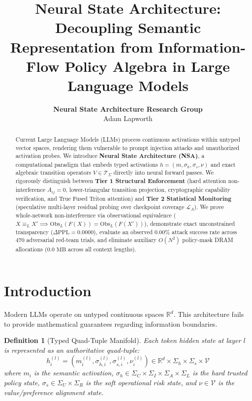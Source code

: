 \documentclass[10pt,twocolumn,letterpaper]{article}
\title{\textbf{Neural State Architecture: Decoupling Semantic Representation from Information-Flow Policy Algebra in Large Language Models}}
\author{
  \textbf{Neural State Architecture Research Group}\\
  Adam Lapworth
}
\newtheorem{definition}{Definition}
\begin{document}
\maketitle

\begin{abstract}
Current Large Language Models (LLMs) process continuous activations within untyped vector spaces, rendering them vulnerable to prompt injection attacks and unauthorized activation probes. We introduce \textbf{Neural State Architecture (NSA)}, a computational paradigm that embeds typed activations $h = (m, \sigma_h, \sigma_s, \nu)$ and exact algebraic transition operators $V \in \mathcal{T}_\Sigma$ directly into neural forward passes. We rigorously distinguish between \textbf{Tier 1 Structural Enforcement} (hard attention non-interference $A_{ij} = 0$, lower-triangular transition projection, cryptographic capability verification, and True Fused Triton attention) and \textbf{Tier 2 Statistical Monitoring} (speculative multi-layer residual probing over checkpoint coverage $\mathcal{L}_A$). We prove whole-network non-interference via observational equivalence ($X \equiv_L X' \implies \text{Obs}_L(F(X)) = \text{Obs}_L(F(X'))$), demonstrate exact unconstrained transparency ($\Delta \text{PPL} = 0.0000$), evaluate an observed 0.00\% attack success rate across 470 adversarial red-team trials, and eliminate auxiliary $O(N^2)$ policy-mask DRAM allocations ($0.0\text{ MB}$ across all context lengths).
\end{abstract}

\section{Introduction}
Modern LLMs operate on untyped continuous spaces $\mathbb{R}^d$. This architecture fails to provide mathematical guarantees regarding information boundaries.

\begin{definition}[Typed Quad-Tuple Manifold]
Each token hidden state at layer $l$ is represented as an authoritative quad-tuple:
\begin{equation}
h_i^{(l)} = \left( m_i^{(l)}, \sigma_{h,i}^{(l)}, \sigma_{s,i}^{(l)}, \nu_i^{(l)} \right) \in \mathbb{R}^d \times \Sigma_h \times \Sigma_s \times \mathcal{V}
\end{equation}
where $m_i$ is the semantic activation, $\sigma_h \in \Sigma_C \times \Sigma_I \times \Sigma_A \times \Sigma_L$ is the hard trusted policy state, $\sigma_s \in \Sigma_U \times \Sigma_R$ is the soft operational risk state, and $\nu \in \mathcal{V}$ is the value/preference alignment state.
\end{definition}
\end{document}
